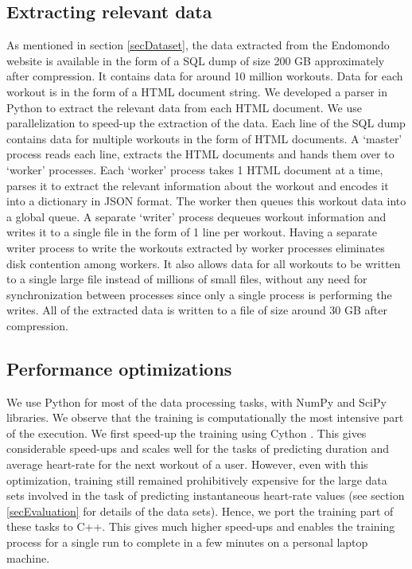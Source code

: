 \documentclass{acm_proc_article-sp}
\begin{document}
\subsection{Extracting relevant data}
As mentioned in section \ref{secDataset}, the data extracted from the Endomondo website \cite{endomondo} is available in the form of a SQL dump of size 200 GB approximately after compression. It contains data for around 10 million workouts. Data for each workout is in the form of a HTML document string. We developed a parser in Python to extract the relevant data from each HTML document.  We use parallelization to speed-up the extraction of the data. Each line of the SQL dump contains data for multiple workouts in the form of HTML documents. A `master' process reads each line, extracts the HTML documents and hands them over to `worker' processes. Each `worker' process takes 1 HTML document at a time, parses it to extract the relevant information about the workout and encodes it into a dictionary in JSON format. The worker then queues this workout data into a global queue. A separate `writer' process dequeues workout information and writes it to a single file in the form of 1 line per workout. Having a separate writer process to write the workouts extracted by worker processes eliminates disk contention among workers. It also allows data for all workouts to be written to a single large file instead of millions of small files, without any need for synchronization between processes since only a single process is performing the writes. All of the extracted data is written to a file of size around 30 GB after compression.

\subsection{Performance optimizations}

We use Python for most of the data processing tasks, with NumPy \cite{numpy} and SciPy \cite{scipy} libraries. We observe that the training is computationally the most intensive part of the execution. We first speed-up the training using Cython \cite{cythonNumpy}. This gives considerable speed-ups and scales well for the tasks of predicting duration and average heart-rate for the next workout of a user. However, even with this optimization, training still remained prohibitively expensive for the large data sets involved in the task of predicting instantaneous heart-rate values (see  section \ref{secEvaluation} for details of the data sets). Hence, we port the training part of these tasks to C++. This gives much higher speed-ups and enables the training process for a single run to complete in a few minutes on a personal laptop machine.
\end{document}
